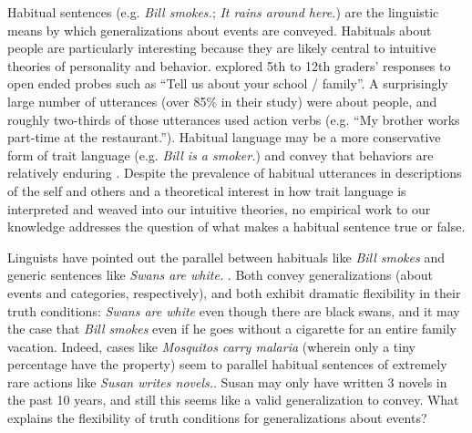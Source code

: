 \documentclass[10pt,letterpaper]{article}
\newcommand{\ndg}[1]{\textcolor{Green}{[ndg: #1]}}
\begin{document}
Habitual sentences (e.g. \emph{Bill smokes.}; \emph{It rains around here.}) are the linguistic means by which generalizations about events are conveyed.
Habituals about people are particularly interesting because they are likely central to intuitive theories of personality and behavior. 
 explored 5th to 12th graders' responses to open ended probes such as ``Tell us about your school / family''. 
A surprisingly large number of utterances (over 85\% in their study) were about people, and roughly two-thirds of those utterances used action verbs (e.g. ``My brother works part-time at the restaurant.''). 
Habitual language may be a more conservative form of trait language (e.g. \emph{Bill is a smoker.}) and convey that behaviors are relatively enduring \cite{Gelman1999, Gelman2004}.
Despite the prevalence of habitual utterances in descriptions of the self and others and a theoretical interest in how trait language is interpreted and weaved into our intuitive theories, no empirical work to our knowledge addresses the question of what makes a habitual sentence true or false.

Linguists have pointed out the parallel between habituals like \emph{Bill smokes} and generic sentences like \emph{Swans are white.} \cite{Carlson1977, Carlson2005, Cohen1999}.
Both convey generalizations (about events and categories, respectively), and both exhibit dramatic flexibility in their truth conditions: \emph{Swans are white} even though there are black swans, and it may the case that \emph{Bill smokes} even if he goes without a cigarette for an entire family vacation.
Indeed, cases like \emph{Mosquitos carry malaria} (wherein only a tiny percentage have the property) seem to parallel habitual sentences of extremely rare actions like \emph{Susan writes novels.}. Susan may only have written 3 novels in the past 10 years, and still this seems like a valid generalization to convey.
What explains the flexibility of truth conditions for generalizations about events?



%
\end{document}
